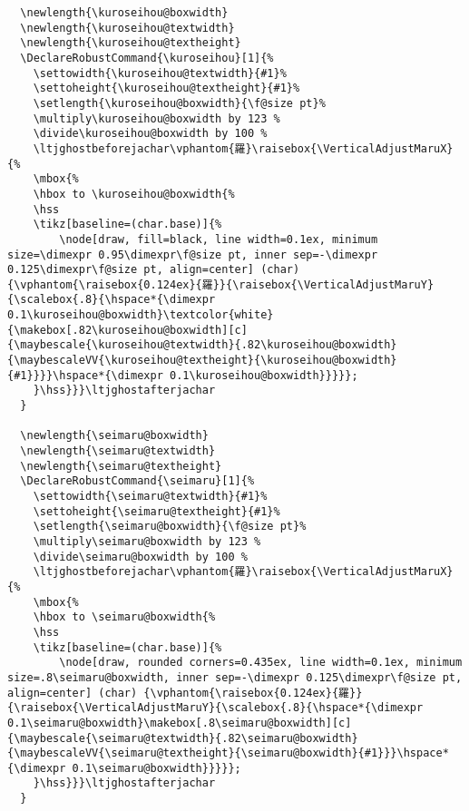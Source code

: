 \documentclass[luatex,fontsize=10pt,paper=b5,twoside]{jlreq}%
\begin{document}
\begin{lstlisting}
  \newlength{\kuroseihou@boxwidth}
  \newlength{\kuroseihou@textwidth}
  \newlength{\kuroseihou@textheight}
  \DeclareRobustCommand{\kuroseihou}[1]{%
    \settowidth{\kuroseihou@textwidth}{#1}%
    \settoheight{\kuroseihou@textheight}{#1}%
    \setlength{\kuroseihou@boxwidth}{\f@size pt}%
    \multiply\kuroseihou@boxwidth by 123 %
    \divide\kuroseihou@boxwidth by 100 %
    \ltjghostbeforejachar\vphantom{羅}\raisebox{\VerticalAdjustMaruX}{%
    \mbox{%
    \hbox to \kuroseihou@boxwidth{%
    \hss
    \tikz[baseline=(char.base)]{%
        \node[draw, fill=black, line width=0.1ex, minimum size=\dimexpr 0.95\dimexpr\f@size pt, inner sep=-\dimexpr 0.125\dimexpr\f@size pt, align=center] (char) {\vphantom{\raisebox{0.124ex}{羅}}{\raisebox{\VerticalAdjustMaruY}{\scalebox{.8}{\hspace*{\dimexpr 0.1\kuroseihou@boxwidth}\textcolor{white}{\makebox[.82\kuroseihou@boxwidth][c]{\maybescale{\kuroseihou@textwidth}{.82\kuroseihou@boxwidth}{\maybescaleVV{\kuroseihou@textheight}{\kuroseihou@boxwidth}{#1}}}}\hspace*{\dimexpr 0.1\kuroseihou@boxwidth}}}}};
    }\hss}}}\ltjghostafterjachar
  }

  \newlength{\seimaru@boxwidth}
  \newlength{\seimaru@textwidth}
  \newlength{\seimaru@textheight}
  \DeclareRobustCommand{\seimaru}[1]{%
    \settowidth{\seimaru@textwidth}{#1}%
    \settoheight{\seimaru@textheight}{#1}%
    \setlength{\seimaru@boxwidth}{\f@size pt}%
    \multiply\seimaru@boxwidth by 123 %
    \divide\seimaru@boxwidth by 100 %
    \ltjghostbeforejachar\vphantom{羅}\raisebox{\VerticalAdjustMaruX}{%
    \mbox{%
    \hbox to \seimaru@boxwidth{%
    \hss
    \tikz[baseline=(char.base)]{%
        \node[draw, rounded corners=0.435ex, line width=0.1ex, minimum size=.8\seimaru@boxwidth, inner sep=-\dimexpr 0.125\dimexpr\f@size pt, align=center] (char) {\vphantom{\raisebox{0.124ex}{羅}}{\raisebox{\VerticalAdjustMaruY}{\scalebox{.8}{\hspace*{\dimexpr 0.1\seimaru@boxwidth}\makebox[.8\seimaru@boxwidth][c]{\maybescale{\seimaru@textwidth}{.82\seimaru@boxwidth}{\maybescaleVV{\seimaru@textheight}{\seimaru@boxwidth}{#1}}}\hspace*{\dimexpr 0.1\seimaru@boxwidth}}}}};
    }\hss}}}\ltjghostafterjachar
  }


\end{lstlisting}
\end{document}
